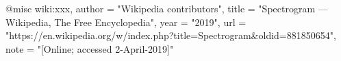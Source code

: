 @misc{ wiki:xxx,
    author = "{Wikipedia contributors}",
    title = "Spectrogram --- {Wikipedia}{,} The Free Encyclopedia",
    year = "2019",
    url = "https://en.wikipedia.org/w/index.php?title=Spectrogram&oldid=881850654",
    note = "[Online; accessed 2-April-2019]"
  }